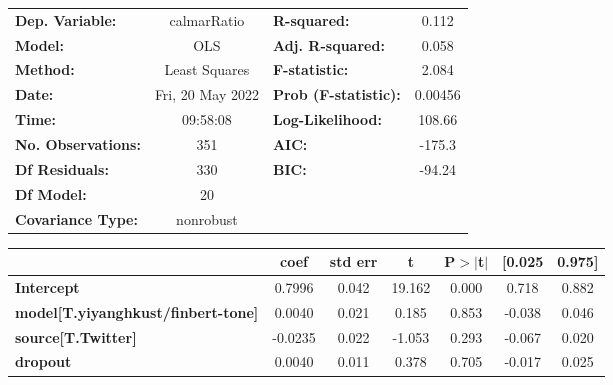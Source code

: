 \begin{center}
\begin{tabular}{lclc}
\toprule
\textbf{Dep. Variable:}                    &   calmarRatio    & \textbf{  R-squared:         } &     0.112   \\
\textbf{Model:}                            &       OLS        & \textbf{  Adj. R-squared:    } &     0.058   \\
\textbf{Method:}                           &  Least Squares   & \textbf{  F-statistic:       } &     2.084   \\
\textbf{Date:}                             & Fri, 20 May 2022 & \textbf{  Prob (F-statistic):} &  0.00456    \\
\textbf{Time:}                             &     09:58:08     & \textbf{  Log-Likelihood:    } &    108.66   \\
\textbf{No. Observations:}                 &         351      & \textbf{  AIC:               } &    -175.3   \\
\textbf{Df Residuals:}                     &         330      & \textbf{  BIC:               } &    -94.24   \\
\textbf{Df Model:}                         &          20      & \textbf{                     } &             \\
\textbf{Covariance Type:}                  &    nonrobust     & \textbf{                     } &             \\
\bottomrule
\end{tabular}
\begin{tabular}{lcccccc}
                                           & \textbf{coef} & \textbf{std err} & \textbf{t} & \textbf{P$> |$t$|$} & \textbf{[0.025} & \textbf{0.975]}  \\
\midrule
\textbf{Intercept}                         &       0.7996  &        0.042     &    19.162  &         0.000        &        0.718    &        0.882     \\
\textbf{model[T.yiyanghkust/finbert-tone]} &       0.0040  &        0.021     &     0.185  &         0.853        &       -0.038    &        0.046     \\
\textbf{source[T.Twitter]}                 &      -0.0235  &        0.022     &    -1.053  &         0.293        &       -0.067    &        0.020     \\
\textbf{dropout}                           &       0.0040  &        0.011     &     0.378  &         0.705        &       -0.017    &        0.025     \\

\end{tabular}
\end{center}
